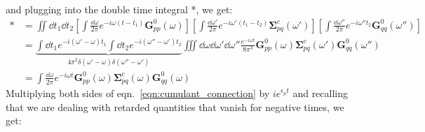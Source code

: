 and plugging into the double time integral *, we get:
\begin{align}
    * &= \iint \dd t_1 \dd t_2 \left[\int \frac{\dd \omega}{2\pi} e^{-i\omega (t-t_1)} \bm{G}_{pp}^{0}(\omega)\right] \left[\int \frac{\dd \omega'}{2\pi} e^{-i\omega' (t_1 - t_2)} \bm{\Sigma}_{pq}^c(\omega')\right] \left[\int \frac{\dd \omega''}{2\pi} e^{-i\omega'' t_2} \bm{G}_{qq}^{0}(\omega'')\right]\\
    &= \underbrace{\int \dd t_1 e^{-i \left(\omega' -\omega\right)t_1} \int \dd t_2 e^{-i \left(\omega'' -\omega'\right)t_2}}_{4\pi^2 \delta(\omega' -\omega)\delta(\omega'' -\omega')} \iiint \dd \omega \dd \omega' \dd \omega'' \frac{e^{-i\omega t}}{8\pi^3} \bm{G}_{pp}^{0}(\omega)\bm{\Sigma}_{pq}^c(\omega')\bm{G}_{qq}^{0}(\omega'')\\
    &= \int \frac{\dd \omega}{2\pi} e^{-i\omega t} \bm{G}_{pp}^{0}(\omega)\bm{\Sigma}_{pq}^c(\omega)\bm{G}_{qq}^{0}(\omega)
\end{align}
Multiplying both sides of eqn.~\ref{eqn:cumulant_connection} by $ie^{\epsilon_p t} $ and recalling that we are dealing with retarded quantities that vanish for negative times, we get:

